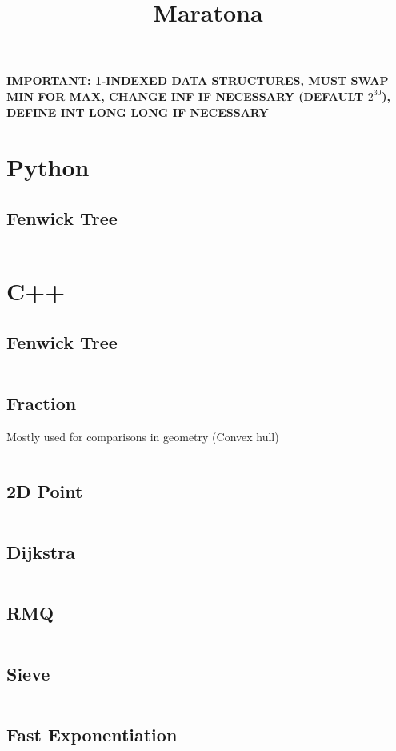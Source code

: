 \documentclass{article}
\title{Maratona}
\author{}
\date{}
\begin{document}
\maketitle

\textbf{IMPORTANT: 1-INDEXED DATA STRUCTURES, MUST SWAP MIN FOR MAX,
CHANGE INF IF NECESSARY (DEFAULT $2^{30}$), DEFINE INT LONG LONG IF NECESSARY}

\tableofcontents
\newpage

\section{Python}
\subsection{Fenwick Tree}
\inputminted{python}{code/fenwick.py}

\section{C++}
\subsection{Fenwick Tree}
\inputminted[obeytabs=true,tabsize=4]{cpp}{code/fenwick.cpp}
\subsection{Fraction}
Mostly used for comparisons in geometry (Convex hull)
\inputminted[obeytabs=true,tabsize=4]{cpp}{code/fraction.cpp}
\subsection{2D Point}
\inputminted[obeytabs=true,tabsize=4]{cpp}{code/point.cpp}
\subsection{Dijkstra}
\inputminted[obeytabs=true,tabsize=4]{cpp}{code/dijkstra.cpp}
\subsection{RMQ}
\inputminted[obeytabs=true,tabsize=4]{cpp}{code/rmq.cpp}
\subsection{Sieve}
\inputminted[obeytabs=true,tabsize=4]{cpp}{code/sieve.cpp}
\subsection{Fast Exponentiation}
\inputminted[obeytabs=true,tabsize=4]{cpp}{code/fast_exp.cpp}
\end{document}

